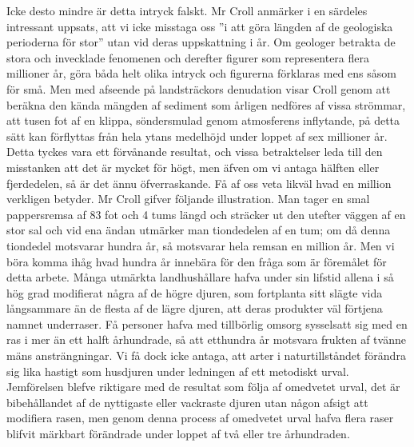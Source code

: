 Icke desto mindre är detta intryck falskt. Mr Croll anmärker i en särdeles intressant uppsats, att vi icke misstaga oss ”i att göra längden af de geologiska perioderna för stor” utan vid deras uppskattning i år. Om geologer betrakta de stora och invecklade fenomenen och derefter figurer som representera flera millioner år, göra båda helt olika intryck och figurerna förklaras med ens såsom för små. Men med afseende på landsträckors denudation visar Croll genom att beräkna den kända mängden af sediment som årligen nedföres af vissa strömmar, att tusen fot af en klippa, söndersmulad genom atmosferens inflytande, på detta sätt kan förflyttas från hela ytans medelhöjd under loppet af sex millioner år. Detta tyckes vara ett förvånande resultat, och vissa betraktelser leda till den misstanken att det är mycket för högt, men äfven om vi antaga hälften eller fjerdedelen, så är det ännu öfverraskande. Få af oss veta likväl hvad en million verkligen betyder. Mr Croll gifver följande illustration. Man tager en smal pappersremsa af 83 fot och 4 tums längd och sträcker ut den utefter väggen af en stor sal och vid ena ändan utmärker man tiondedelen af en tum; om då denna tiondedel motsvarar hundra år, så motsvarar hela remsan en million år. Men vi böra komma ihåg hvad hundra år innebära för den fråga som är föremålet för detta arbete. Många utmärkta landhushållare hafva under sin lifstid allena i så hög grad modifierat några af de högre djuren, som fortplanta sitt slägte vida långsammare än de flesta af de lägre djuren, att deras produkter väl förtjena namnet underraser. Få personer hafva med tillbörlig omsorg sysselsatt sig med en ras i mer än ett halft århundrade, så att etthundra år motsvara frukten af tvänne mäns ansträngningar. Vi få dock icke antaga, att arter i naturtillståndet förändra sig lika hastigt som husdjuren under ledningen af ett metodiskt urval. Jemförelsen blefve riktigare med de resultat som följa af omedvetet urval, det är bibehållandet af de nyttigaste eller vackraste djuren utan någon afsigt att modifiera rasen, men genom denna process af omedvetet urval hafva flera raser blifvit märkbart förändrade under loppet af två eller tre århundraden.

